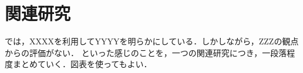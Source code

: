 \documentclass[main]{subfiles}
\begin{document}
\chapter{関連研究}
\label{cha:related}

\cite{Athuraliya01:Emprical} では，XXXXを利用してYYYYを明らかにしている．しかしながら，ZZZの観点からの評価がない．
といった感じのことを，一つの関連研究につき，一段落程度まとめていく．図表を使ってもよい．
\end{document}

